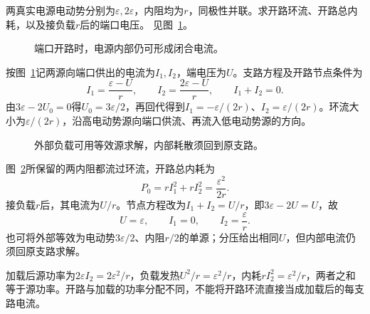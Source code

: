 \begin{exercise}[两个并联电源的环流与发热]\label{ex:c1-h6}
两真实电源电动势分别为$\varepsilon,2\varepsilon$，内阻均为$r$，同极性并联。求开路环流、开路总内耗，以及接负载$r$后的端口电压。 见图~\ref{fig:c1-h6-q}。
\end{exercise}

\begin{figure}[H]\centering
{}
\caption{端口开路时，电源内部仍可形成闭合电流。}\label{fig:c1-h6-q}
\end{figure}
\begin{solution}
按图~\ref{fig:c1-h6-q}记两源向端口供出的电流为$I_1,I_2$，端电压为$U$。支路方程及开路节点条件为
\[
 I_1=\frac{\varepsilon-U}r,\qquad I_2=\frac{2\varepsilon-U}r,
 \qquad I_1+I_2=0.
\]
由$3\varepsilon-2U_0=0$得$U_0=3\varepsilon/2$，再回代得到$I_1=-\varepsilon/(2r)$、$I_2=\varepsilon/(2r)$。环流大小为$\varepsilon/(2r)$，沿高电动势源向端口供流、再流入低电动势源的方向。
\begin{figure}[H]\centering
{}
\caption{外部负载可用等效源求解，内部耗散须回到原支路。}\label{fig:c1-h6-s}
\end{figure}
图~\ref{fig:c1-h6-s}所保留的两内阻都流过环流，开路总内耗为
\[
 \boxed{P_0=rI_1^2+rI_2^2=\frac{\varepsilon^2}{2r}}.
\]
接负载$r$后，其电流为$U/r$。节点方程改为$I_1+I_2=U/r$，即$3\varepsilon-2U=U$，故
\[
 \boxed{U=\varepsilon},\qquad I_1=0,\qquad I_2=\frac\varepsilon r.
\]
也可将外部等效为电动势$3\varepsilon/2$、内阻$r/2$的单源；分压给出相同$U$，但内部电流仍须回原支路求解。

加载后源功率为$2\varepsilon I_2=2\varepsilon^2/r$，负载发热$U^2/r=\varepsilon^2/r$，内耗$rI_2^2=\varepsilon^2/r$，两者之和等于源功率。开路与加载的功率分配不同，不能将开路环流直接当成加载后的每支路电流。
\end{solution}

